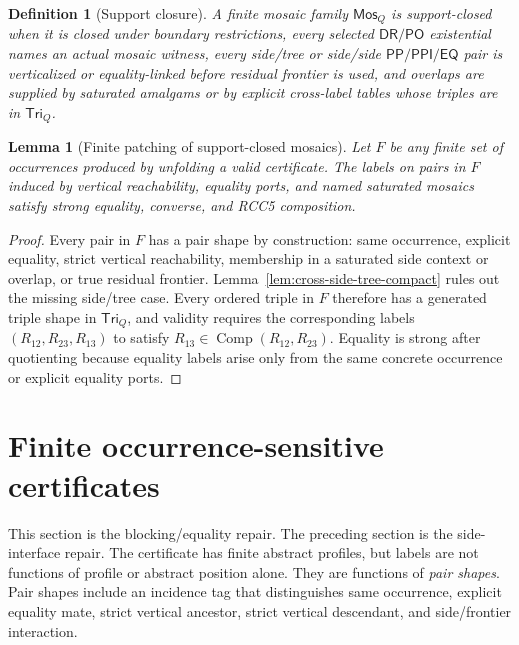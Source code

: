 \documentclass[11pt]{article}
\newtheorem{lemma}[theorem]{Lemma}
\newtheorem{definition}[theorem]{Definition}
\newcommand{\EQ}{\mathsf{EQ}}
\newcommand{\PP}{\mathsf{PP}}
\newcommand{\PPI}{\mathsf{PPI}}
\newcommand{\PO}{\mathsf{PO}}
\newcommand{\DR}{\mathsf{DR}}
\newcommand{\comp}{\operatorname{Comp}}
\newcommand{\Mos}{\mathsf{Mos}}
\newcommand{\Tri}{\mathsf{Tri}}
\begin{document}
\begin{definition}[Support closure]
A finite mosaic family \(\Mos_Q\) is support-closed when it is closed under boundary restrictions, every selected \(\DR/\PO\) existential names an actual mosaic witness, every side/tree or side/side \(\PP/\PPI/\EQ\) pair is verticalized or equality-linked before residual frontier is used, and overlaps are supplied by saturated amalgams or by explicit cross-label tables whose triples are in \(\Tri_Q\).
\end{definition}

\begin{lemma}[Finite patching of support-closed mosaics]\label{lem:patch}
Let \(F\) be any finite set of occurrences produced by unfolding a valid certificate.  The labels on pairs in \(F\) induced by vertical reachability, equality ports, and named saturated mosaics satisfy strong equality, converse, and RCC5 composition.
\end{lemma}

\begin{proof}
Every pair in \(F\) has a pair shape by construction: same occurrence, explicit equality, strict vertical reachability, membership in a saturated side context or overlap, or true residual frontier.  Lemma~\ref{lem:cross-side-tree-compact} rules out the missing side/tree case.  Every ordered triple in \(F\) therefore has a generated triple shape in \(\Tri_Q\), and validity requires the corresponding labels \((R_{12},R_{23},R_{13})\) to satisfy \(R_{13}\in\comp(R_{12},R_{23})\).  Equality is strong after quotienting because equality labels arise only from the same concrete occurrence or explicit equality ports.
\end{proof}


\section{Finite occurrence-sensitive certificates}

This section is the blocking/equality repair.  The preceding section is the side-interface repair.  The certificate has finite abstract profiles, but labels are not functions of profile or abstract position alone.  They are functions of \emph{pair shapes}.  Pair shapes include an incidence tag that distinguishes same occurrence, explicit equality mate, strict vertical ancestor, strict vertical descendant, and side/frontier interaction.
\end{document}
